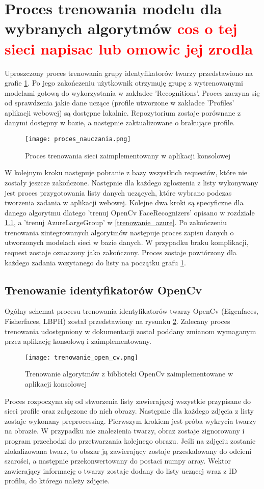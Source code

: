 \section{Proces trenowania modelu dla wybranych algorytmów \textcolor{red}{cos o tej sieci napisac lub omowic jej zrodla}}
Uproszczony proces trenowania grupy identyfikatorów twarzy przedstawiono na grafie \ref{fig:trenowanie_proces}. Po jego zakończeniu użytkownik otrzymuję grupę z wytrenowanymi modelami gotową do wykorzystania w zakładce 'Recognitions'.
Proces zaczyna się od sprawdzenia jakie dane uczące (profile utworzone w zakładce 'Profiles' aplikacji webowej) są dostępne lokalnie. Repozytorium zostaje porównane z danymi dostępny w bazie, a następnie zaktualizowane o brakujące profile.
\begin{figure}[H]
	\centering
	\texttt{[image: proces\_nauczania.png]}
	\caption{Proces trenowania sieci zaimplementowany w aplikacji konsolowej}
	\label{fig:trenowanie_proces}
\end{figure}
W kolejnym kroku następuje pobranie z bazy wszystkich requestów, które nie zostały jeszcze zakończone. Następnie dla każdego zgłoszenia z listy wykonywany jest proces przygotowania listy danych uczących, które wybrano podczas tworzenia zadania w aplikacji webowej. Kolejne dwa kroki są specyficzne dla danego algorytmu dlatego 'trenuj OpenCv FaceRecognizers' opisano w rozdziale \ref{trenowanie_open_cv}, a 'trenuj AzureLargeGroup' w \ref{trenowanie_azure}. Po zakończeniu trenowania zintegrowanych algorytmów następuje proces zapisu danych o utworzonych modelach sieci w bazie danych.
W przypadku braku komplikacji, request zostaje oznaczony jako zakończony. Proces zostaje powtórzony dla każdego zadania wczytanego do listy na początku grafu \ref{fig:trenowanie_proces}.

\subsection{Trenowanie identyfikatorów OpenCv} \label{trenowanie_open_cv}
Ogólny schemat procesu trenowania identyfikatorów twarzy OpenCv (Eigenfaces, Fisherfaces, LBPH) został przedstawiony na rysunku \ref{fig:trenowanie_open_cv}. Zalecany proces trenowania udostępniony w dokumentacji \cite{opencv_doc} został poddany zmianom wymaganym przez aplikację konsolową i zaimplementowany.
\begin{figure}[H]
	\centering
	\texttt{[image: trenowanie\_open\_cv.png]}
	\caption{Trenowanie algorytmów z biblioteki OpenCv zaimplementowane w aplikacji konsolowej}
	\label{fig:trenowanie_open_cv}
\end{figure}
Proces rozpoczyna się od stworzenia listy zawierającej wszystkie przypisane do sieci profile oraz załączone do nich obrazy. Następnie dla każdego zdjęcia z listy zostaje wykonany preprocessing. Pierwszym krokiem jest próba wykrycia twarzy na obrazie. W przypadku nie znalezienia twarzy, obraz zostaje zignorowany i program przechodzi do przetwarzania kolejnego obrazu. Jeśli na zdjęciu zostanie zlokalizowana twarz, to obszar ją zawierający zostaje przeskalowany do odcieni szarości, a następnie przekonwertowany do postaci numpy array. Wektor zawierający informację o twarzy zostaje dodany do listy uczącej wraz z ID profilu, do którego należy zdjęcie. 

